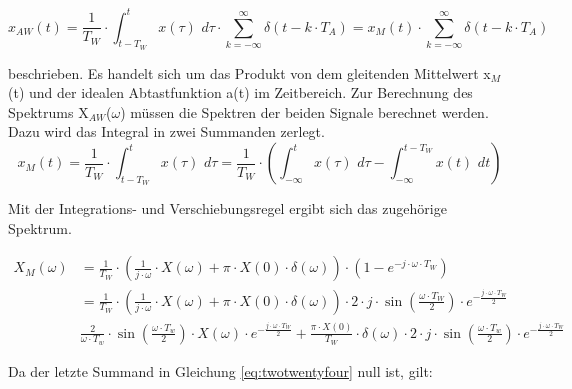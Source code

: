 \begin{equation}\label{eq:twotwentytwo}
x_{AW} \left(t\right)=\frac{1}{T_{W} } \cdot \int _{t-T_{W} }^{t}x\left(\tau \right)\, \, d\tau  \cdot \sum _{k=-\infty }^{\infty }\delta \left(t-k\cdot T_{A} \right) =x_{M} \left(t\right)\cdot \sum _{k=-\infty }^{\infty }\delta \left(t-k\cdot T_{A} \right)
\end{equation}

\noindent beschrieben. Es handelt sich um das Produkt von dem gleitenden Mittelwert x${}_{M}$(t) und der idealen Abtastfunktion a(t) im Zeitbereich. Zur Berechnung des Spektrums X${}_{AW}$($\omega$) müssen die Spektren der beiden Signale berechnet werden. Dazu wird das Integral in zwei Summanden zerlegt. 
\begin{equation}\label{eq:twotwentythree}
x_{M} \left(t\right)=\frac{1}{T_{W} } \cdot \int _{t-T_{W} }^{t}x\left(\tau \right)\, \, d\tau  =\frac{1}{T_{W} } \cdot \left(\int _{-\infty }^{t}x\left(\tau \right)\, \, d\tau  -\int _{-\infty }^{t-T_{W} }x\left(t\right)\, \, dt \right)
\end{equation}

\noindent Mit der Integrations- und Verschiebungsregel ergibt sich das zugehörige Spektrum.

\begin{equation}\label{eq:twotwentyfour}
\begin{split}
X_{M} \left(\omega \right) & = \frac{1}{T_{W} } \cdot \left(\frac{1}{j\cdot \omega } \cdot X\left(\omega \right)+\pi \cdot X\left(0\right)\cdot \delta \left(\omega \right)\right)\cdot \left(1-e^{-j\cdot \omega \cdot T_{W} } \right) \\ 
& = \frac{1}{T_{W} } \cdot \left(\frac{1}{j\cdot \omega } \cdot X\left(\omega \right)+\pi \cdot X\left(0\right)\cdot \delta \left(\omega \right)\right)\cdot 2\cdot j\cdot \sin \left(\frac{\omega \cdot T_{W} }{2} \right)\cdot e^{-\frac{j\cdot \omega \cdot T_{W} }{2} }  \\
& \frac{2}{\omega \cdot T_{w} } \cdot\sin \left(\frac{\omega \cdot T_{w}}{2}\right) \cdot X(\omega)\cdot e^{-\frac{j\cdot \omega \cdot T_{W} }{2} } + \frac{\pi\cdot X(0)}{T_{W}}\cdot \delta(\omega) \cdot 2 \cdot j \cdot \sin \left(\frac{\omega \cdot T_{w}}{2}\right)\cdot e^{-\frac{j\cdot \omega \cdot T_{W} }{2} }
\end{split}
\end{equation}

\noindent Da der letzte Summand in Gleichung \eqref{eq:twotwentyfour} null ist, gilt:


